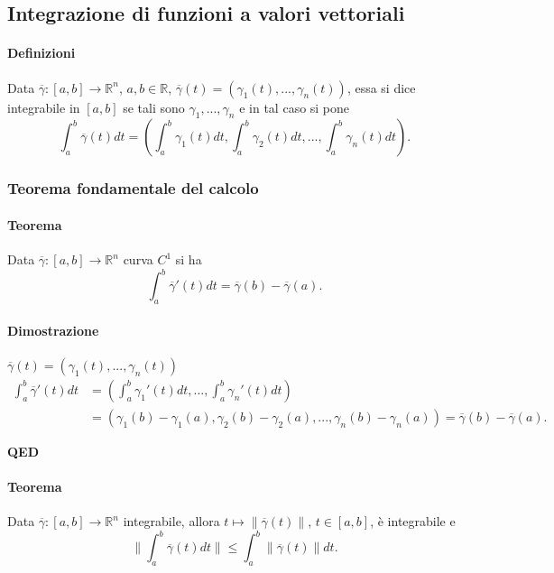 \documentclass{article}
\newcommand{\R}{\mathbb{R}}
\begin{document}
\subsection{{Integrazione di funzioni a valori vettoriali}}
\paragraph{{Definizioni}}
Data $\overline{\gamma}:[a,b]\rightarrow \R^n$, $a,b\in \R$, $\overline{\gamma}(t)=(\gamma_1(t),...,\gamma_n(t))$, essa si dice integrabile in $[a,b]$ se tali sono $\gamma_1,...,\gamma_n$ e in tal caso si pone
\begin{equation*}
    \int_{a}^{b}\overline{\gamma}(t)dt=\left(\int_{a}^{b}\gamma_1(t)dt,\int_{a}^{b}\gamma_2(t)dt,...,\int_{a}^{b}\gamma_n(t)dt\right).
\end{equation*}

\subsubsection{{Teorema fondamentale del calcolo}}
\paragraph{{Teorema}}
Data $\overline{\gamma}:[a,b]\rightarrow \R^n$ curva $C^1$ si ha
\begin{equation*}
    \int_a^b\overline{\gamma}'(t)dt=\overline{\gamma}(b)-\overline{\gamma}(a).
\end{equation*}
\paragraph{{Dimostrazione}}
$\overline{\gamma}(t)=(\gamma_1(t),...,\gamma_n(t))$
\begin{align*}
    \int_a^b\overline{\gamma}'(t)dt&=\left( \int_a^b \gamma_1'(t)dt,...,\int_a^b \gamma_n'(t)dt \right)\\
    &=\left( \gamma_1(b)-\gamma_1(a),\gamma_2(b)-\gamma_2(a),...,\gamma_n(b)-\gamma_n(a)\right) =\overline{\gamma}(b)-\overline{\gamma}(a).
\end{align*}
\begin{flushright}
 \textbf{QED}
\end{flushright}

\paragraph{{Teorema}}
Data $\overline{\gamma}: [a,b]\rightarrow \R^n$ integrabile, allora $t \mapsto \|\overline{\gamma}(t)\|$, $t\in[a,b]$, è integrabile e 
\begin{equation*}
    \|\int_a^b\overline{\gamma}(t)dt\|\leq \int_a^b\|\overline{\gamma}(t)\|dt.
\end{equation*}
\end{document}
